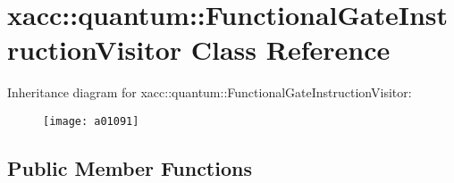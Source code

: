 \hypertarget{a01091}{}\section{xacc\+:\+:quantum\+:\+:Functional\+Gate\+Instruction\+Visitor Class Reference}
\label{a01091}
Inheritance diagram for xacc\+:\+:quantum\+:\+:Functional\+Gate\+Instruction\+Visitor\+:\begin{figure}[H]
\begin{center}
\leavevmode
\texttt{[image: a01091]}
\end{center}
\end{figure}
\subsection*{Public Member Functions}
